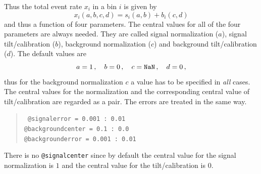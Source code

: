 Thus the total event rate $x_i$ in a bin $i$ is given by
\begin{equation}
x_i(a,b,c,d)=s_i(a,b)+b_i(c,d)
\end{equation}
and thus a function of four parameters. The central values for all of
the four parameters are always needed. They are called signal normalization
($a$), signal tilt/calibration ($b$), background  normalization ($c$) and
background tilt/calibration ($d$). The default values are
\begin{equation}
a=1\,,\quad b=0\,,\quad c={\tt NaN}\,,\quad d=0\,,
\end{equation}
thus for the background normalization $c$ a value has to be specified in 
\emph{all} cases. The central values for the normalization and the 
corresponding central value of tilt/calibration are regarded
as a pair. The errors are treated in the same way.
\begin{quote}
{\tt
\tb @signalerror =       0.001  :       0.01\\
\tb @backgroundcenter =  0.1 :       0.0\\
\tb @backgrounderror =   0.001 :       0.01
}
\end{quote}
There is no {\tt @signalcenter} since by default the central value for the
signal normalization is $1$ and the central value for the tilt/calibration 
is $0$.  

